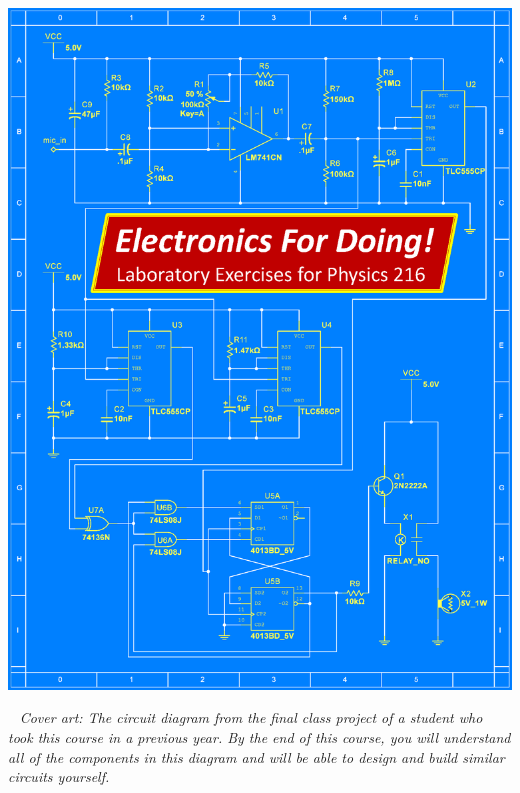 \thispagestyle{empty}

\begin{center}
\includegraphics[width=8.44in]{electronics_front_pages/electronics_front_cover_kuri.eps}
\end{center}
\newpage

\restoregeometry
\restorepagecolor
\thispagestyle{empty}

\
\vfill
\textit{Cover art: The circuit diagram from the final class project of a student who took this course in a previous year.  By the end of this course, you will understand all of the components in this diagram and will be able to design and build similar circuits  yourself.}
\pagebreak



